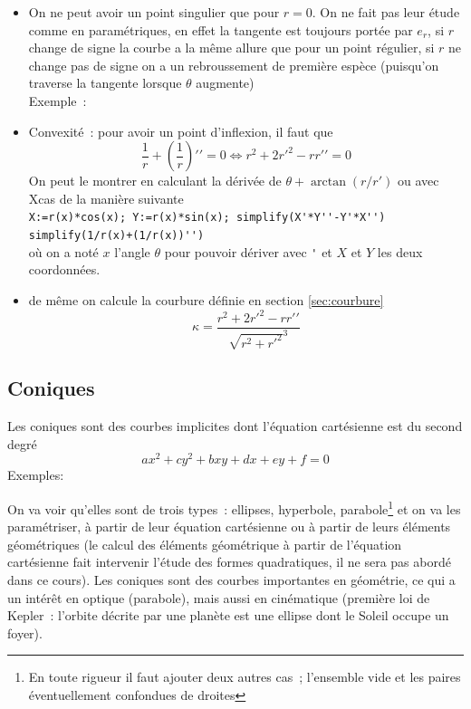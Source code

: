 \documentclass[a4paper,11pt]{article}
\begin{document}
\begin{giacjshere}
\begin{itemize}
{cela se lit sur l'expression de la vitesse qui est non nulle, mais
c'est encore vrai si $r(\theta)=r'(\theta)=0$ et $r$ non identiquement nul, 
pour le voir, on observe que $M(\theta)M(\theta+h)=OM(\theta+h)$ a pour
direction $e_r(\theta+h)$ qui tend vers $e_r(\theta)$ lorsque $h$ tend
vers 0.}
\item On ne peut avoir un point singulier que pour $r=0$. On ne fait
pas leur \'etude comme en param\'etriques, en effet la tangente est
toujours port\'ee par $e_r$, si $r$ change de signe la courbe
a la m\^eme allure que pour un point r\'egulier, si $r$ ne change pas
de signe on a un rebroussement de premi\`ere esp\`ece (puisqu'on
traverse la tangente lorsque $\theta$ augmente)\\
Exemple~: 
\item Convexité~:  pour avoir un point d'inflexion, il faut que 
$$\frac1r + \left(\frac1r\right)'{'}=0
\Leftrightarrow
r^2+2r'^2-rr'{'}=0
$$
On peut le montrer en calculant la d\'eriv\'ee de
$\theta+\arctan(r/r')$ 
ou avec Xcas de la manière suivante\\
\verb|X:=r(x)*cos(x); Y:=r(x)*sin(x); simplify(X'*Y''-Y'*X'')|\\
\verb|simplify(1/r(x)+(1/r(x))'')|\\
où on a noté $x$ l'angle $\theta$ pour pouvoir dériver avec \verb|'|
et $X$ et $Y$ les deux coordonnées.
\item de même on calcule la courbure d\'efinie en section \ref{sec:courbure}
$$ \kappa = \frac{r^2+2r'^2-rr'{'}}{\sqrt{r^2+r'^2}^3}$$
\end{itemize}

\subsection{Coniques}
Les coniques sont des courbes implicites dont l'\'equation
cart\'esienne est du second degr\'e~
$$ax^2+cy^2+bxy+dx+ey+f=0$$
Exemples:\\

On va voir qu'elles sont de trois types~: ellipses, hyperbole,
parabole\footnote{En toute rigueur il faut ajouter deux autres cas~;
l'ensemble vide et les paires \'eventuellement confondues de droites} 
et on va les param\'etriser, \`a partir de leur \'equation
cart\'esienne ou \`a partir de leurs \'el\'ements g\'eom\'etriques
(le calcul des \'el\'ements g\'eom\'etrique \`a partir de l'\'equation
cart\'esienne fait intervenir l'\'etude des formes quadratiques, il ne
sera pas abord\'e dans ce cours).
Les coniques sont des courbes importantes en g\'eom\'etrie, 
ce qui a un int\'er\^et en optique 
(parabole), mais aussi en cin\'ematique (premi\`ere loi de Kepler~:
l'orbite d\'ecrite par une plan\`ete est une ellipse dont
le Soleil occupe un foyer).



\end{giacjshere}
\end{document}
